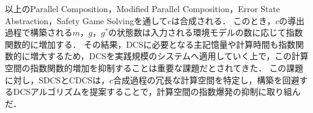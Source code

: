 以上のParallel Composition，Modified Parallel Composition，Error State Abstraction，Safety Game Solvingを通して$c$は合成される．
このとき，$c$の導出過程で構築される$m$，$g$，$g^*$の状態数は入力される環境モデルの数に応じて指数関数的に増加する．
その結果，DCSに必要となる主記憶量や計算時間も指数関数的に増大するため，DCSを実践規模のシステムへ適用していく上で，この計算空間の指数関数的増加を抑制することは重要な課題だとされてきた\cite{paper:DirectedControllerSyntehsis}\cite{aizawa:IEICEJ2020}\cite{aizawa:SmartWorld}．
この課題に対し，SDCS\cite{yamauchi:IEICEJ2023}とCDCS\cite{yamauchi:IPSJ2024}は，$c$合成過程の冗長な計算空間を特定し，構築を回避するDCSアルゴリズムを提案することで，計算空間の指数爆発の抑制に取り組んだ．

